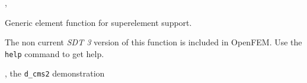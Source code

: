 
\noindent \feceig, \femk





 



\noindent Generic element function for superelement support.


The non current {\sl SDT 3} version of this function is included in OpenFEM. Use the {\tt help}  command to get help.



\noindent \fesuper, the {\tt d\_cms2} demonstration


